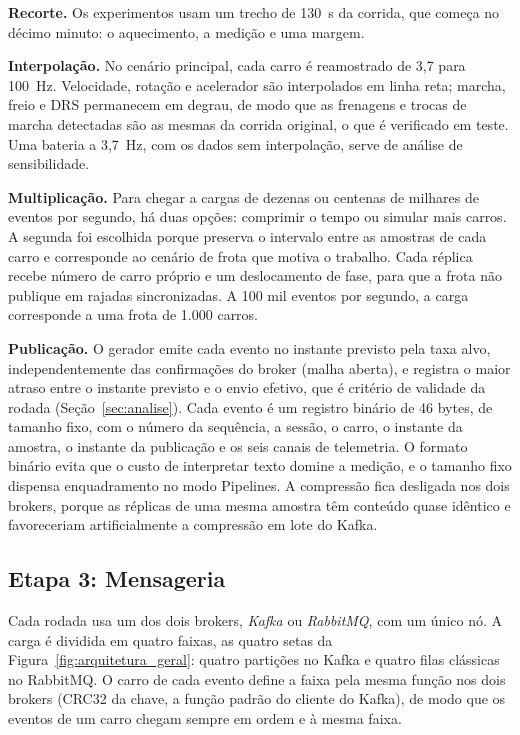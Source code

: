 \documentclass[12pt]{article}
\begin{document}
\textbf{Recorte.} Os experimentos usam um trecho de 130~s da corrida, que começa
no décimo minuto: o aquecimento, a medição e uma margem.

\textbf{Interpolação.} No cenário principal, cada carro é reamostrado de 3,7 para
100~Hz. Velocidade, rotação e acelerador são interpolados em linha reta; marcha,
freio e DRS permanecem em degrau, de modo que as frenagens e trocas de marcha
detectadas são as mesmas da corrida original, o que é verificado em teste. Uma
bateria a 3,7~Hz, com os dados sem interpolação, serve de análise de
sensibilidade.

\textbf{Multiplicação.} Para chegar a cargas de dezenas ou centenas de milhares
de eventos por segundo, há duas opções: comprimir o tempo ou simular mais carros.
A segunda foi escolhida porque preserva o intervalo entre as amostras de cada
carro e corresponde ao cenário de frota que motiva o trabalho. Cada réplica recebe
número de carro próprio e um deslocamento de fase, para que a frota não publique
em rajadas sincronizadas. A 100 mil eventos por segundo, a carga corresponde a uma
frota de 1.000 carros.

\textbf{Publicação.} O gerador emite cada evento no instante previsto pela taxa
alvo, independentemente das confirmações do broker (malha aberta), e registra o
maior atraso entre o instante previsto e o envio efetivo, que é critério de
validade da rodada (Seção~\ref{sec:analise}). Cada evento é um registro binário de
46 bytes, de tamanho fixo, com o número da sequência, a sessão, o carro, o
instante da amostra, o instante da publicação e os seis canais de telemetria. O
formato binário evita que o custo de interpretar texto domine a medição, e o
tamanho fixo dispensa enquadramento no modo Pipelines. A compressão fica
desligada nos dois brokers, porque as réplicas de uma mesma amostra têm conteúdo
quase idêntico e favoreceriam artificialmente a compressão em lote do Kafka.

\subsection{Etapa 3: Mensageria}
\label{sec:mensageria}

Cada rodada usa um dos dois brokers, \textit{Kafka} ou \textit{RabbitMQ}, com um
único nó. A carga é dividida em quatro faixas, as quatro setas da
Figura~\ref{fig:arquitetura_geral}: quatro partições no Kafka e quatro filas
clássicas no RabbitMQ. O carro de cada evento define a faixa pela mesma
função nos dois brokers (CRC32 da chave, a função padrão do cliente do Kafka), de
modo que os eventos de um carro chegam sempre em ordem e à mesma faixa.
\end{document}
